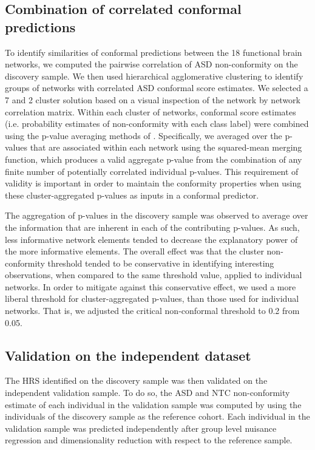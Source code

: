 \documentclass[9pt,lineno]{elife}
\begin{document}
\subsection{Combination of correlated conformal predictions}
To identify similarities of conformal predictions between the 18 functional brain networks, we computed the pairwise correlation of ASD non-conformity on the discovery sample. We then used hierarchical agglomerative clustering to identify groups of networks with correlated ASD conformal score estimates. We selected a 7 and 2 cluster solution based on a visual inspection of the network by network correlation matrix.
Within each cluster of networks, conformal score estimates (i.e. probability estimates of non-conformity with each class label) were combined using the p-value averaging methods of \citep{Vovk2012-of}. Specifically, we averaged over the p-values that are associated within each network using the squared-mean merging function, which produces a valid aggregate p-value from the combination of any finite number of potentially correlated individual p-values. This requirement of validity is important in order to maintain the conformity properties when using these cluster-aggregated p-values as inputs in a conformal predictor.

The aggregation of p-values in the discovery sample was observed to average over the information that are inherent in each of the contributing p-values. As such, less informative network elements tended to decrease the explanatory power of the more informative elements. The overall effect was that the cluster non-conformity threshold tended to be conservative in identifying interesting observations, when compared to the same threshold value, applied to individual networks. In order to mitigate against this conservative effect, we used a more liberal threshold for cluster-aggregated p-values, than those used for individual networks. That is, we adjusted the critical non-conformal threshold to 0.2 from 0.05. 

\subsection{Validation on the independent dataset}
The HRS identified on the discovery sample was then validated on the independent validation sample. To do so, the ASD and NTC non-conformity estimate of each individual in the validation sample was computed by using the individuals of the discovery sample as the reference cohort. Each individual in the validation sample was predicted independently after group level nuisance regression and dimensionality reduction with respect to the reference sample.
\end{document}

